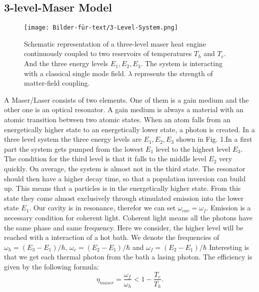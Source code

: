 \documentclass[12pt,a4paper]{article}
\begin{document}
\subsection{3-level-Maser Model}
\begin{figure}[h!] 
\texttt{[image: Bilder-für-text/3-Level-System.png]}
\caption{Schematic representation of a three-level maser heat engine
continuously coupled to two reservoirs of temperatures $T_h$ and
$T_c$. And the three energy levels $E_1,E_2,E_3$. The
system is interacting with a classical single mode field. $\lambda$
represents the strength of matter-field coupling.}
\end{figure}
A Maser/Laser consists of two elements. One of them is a gain medium and the other one is an optical resonator. A gain medium is always a material with an atomic transition between two atomic states. When an atom falls from an energetically higher state to an energetically lower state, a photon is created.
In a three level system the three energy levels are $E_1,E_2,E_3$ shown in Fig. 1.In a first part the system gets pumped from the lowest $E_1$ level to the highest level $ E_3$. The condition for the third level is that it falls to the middle level $ E_2$ very quickly. On average, the system is almost not in the third state. The resonator should then have a higher decay time, so that a population inversion can build up. This means that a particles is in the energetically higher state. From this state they come almost exclusively through stimulated emission into the lower state $ E_1$.  Our cavity is in  resonance, therefor we can set $\omega_{cav}=\omega_f$.
Emission is a necessary condition for coherent light. Coherent light means all the photons have the same phase and same frequency. \cite{Li2017}
Here we consider, the higher level will be reached with a interaction of a hot bath.  
We denote the frequencies of $\omega_h=(E_3-E_1)/\hbar$, $\omega_c=(E_2-E_1)/\hbar$ and $\omega_f=(E_2-E_1)/\hbar$
Interesting is that we get each thermal photon from the bath a lasing photon. 
The efficiency is given by the following formula:
\begin{equation}
\eta_{maser}=\frac{\omega_f}{\omega_h}<1-\frac{T_c}{T_h}.
\end{equation}
\end{document}
